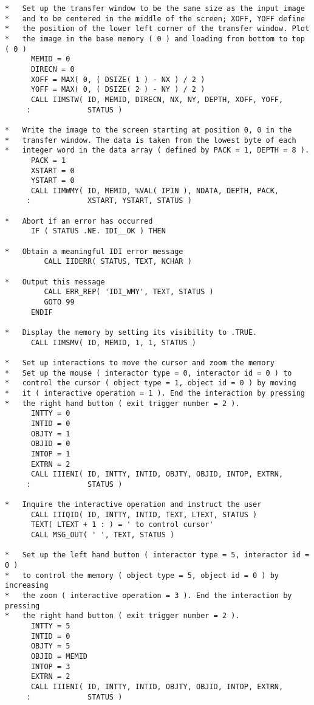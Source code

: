 \begin{small}
\begin{verbatim}
*   Set up the transfer window to be the same size as the input image
*   and to be centered in the middle of the screen; XOFF, YOFF define
*   the position of the lower left corner of the transfer window. Plot
*   the image in the base memory ( 0 ) and loading from bottom to top ( 0 )
      MEMID = 0
      DIRECN = 0
      XOFF = MAX( 0, ( DSIZE( 1 ) - NX ) / 2 )
      YOFF = MAX( 0, ( DSIZE( 2 ) - NY ) / 2 )
      CALL IIMSTW( ID, MEMID, DIRECN, NX, NY, DEPTH, XOFF, YOFF,
     :             STATUS )

*   Write the image to the screen starting at position 0, 0 in the
*   transfer window. The data is taken from the lowest byte of each
*   integer word in the data array ( defined by PACK = 1, DEPTH = 8 ).
      PACK = 1
      XSTART = 0
      YSTART = 0
      CALL IIMWMY( ID, MEMID, %VAL( IPIN ), NDATA, DEPTH, PACK,
     :             XSTART, YSTART, STATUS )

*   Abort if an error has occurred
      IF ( STATUS .NE. IDI__OK ) THEN

*   Obtain a meaningful IDI error message
         CALL IIDERR( STATUS, TEXT, NCHAR )

*   Output this message
         CALL ERR_REP( 'IDI_WMY', TEXT, STATUS )
         GOTO 99
      ENDIF

*   Display the memory by setting its visibility to .TRUE.
      CALL IIMSMV( ID, MEMID, 1, 1, STATUS )

*   Set up interactions to move the cursor and zoom the memory
*   Set up the mouse ( interactor type = 0, interactor id = 0 ) to
*   control the cursor ( object type = 1, object id = 0 ) by moving
*   it ( interactive operation = 1 ). End the interaction by pressing
*   the right hand button ( exit trigger number = 2 ).
      INTTY = 0
      INTID = 0
      OBJTY = 1
      OBJID = 0
      INTOP = 1
      EXTRN = 2
      CALL IIIENI( ID, INTTY, INTID, OBJTY, OBJID, INTOP, EXTRN,
     :             STATUS )

*   Inquire the interactive operation and instruct the user
      CALL IIIQID( ID, INTTY, INTID, TEXT, LTEXT, STATUS )
      TEXT( LTEXT + 1 : ) = ' to control cursor'
      CALL MSG_OUT( ' ', TEXT, STATUS )

*   Set up the left hand button ( interactor type = 5, interactor id = 0 )
*   to control the memory ( object type = 5, object id = 0 ) by increasing
*   the zoom ( interactive operation = 3 ). End the interaction by pressing
*   the right hand button ( exit trigger number = 2 ).
      INTTY = 5
      INTID = 0
      OBJTY = 5
      OBJID = MEMID
      INTOP = 3
      EXTRN = 2
      CALL IIIENI( ID, INTTY, INTID, OBJTY, OBJID, INTOP, EXTRN,
     :             STATUS )


\end{verbatim}
\end{small}
